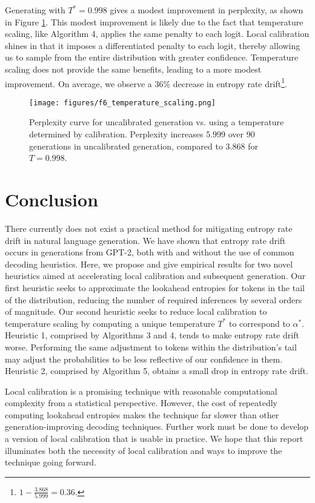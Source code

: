 \documentclass[pageno]{jpaper}
\begin{document}
Generating with $T^*=0.998$ gives a modest improvement in perplexity, as shown in Figure \ref{temp-scaling}. This modest improvement is likely due to the fact that temperature scaling, like Algorithm 4, applies the same penalty to each logit. Local calibration shines in that it imposes a differentiated penalty to each logit, thereby allowing us to sample from the entire distribution with greater confidence. Temperature scaling does not provide the same benefits, leading to a more modest improvement. On average, we observe a 36\% decrease in entropy rate drift\footnote{$1 - \frac{3.868}{5.999} = 0.36$.}.

\begin{figure}
    \centering
    \texttt{[image: figures/f6\_temperature\_scaling.png]}
    \caption{Perplexity curve for uncalibrated generation vs. using a temperature determined by calibration. Perplexity increases 5.999 over 90 generations in uncalibrated generation, compared to 3.868 for $T=0.998$.}
    \label{temp-scaling}
\end{figure}

\section{Conclusion}

There currently does not exist a practical method for mitigating entropy rate drift in natural language generation. We have shown that entropy rate drift occurs in generations from GPT-2, both with and without the use of common decoding heuristics. Here, we propose and give empirical results for two novel heuristics aimed at accelerating local calibration and subsequent generation. Our first heuristic seeks to approximate the lookahead entropies for tokens in the tail of the distribution, reducing the number of required inferences by several orders of magnitude. Our second heuristic seeks to reduce local calibration to temperature scaling by computing a unique temperature $T^*$ to correspond to $\alpha^*$. Heuristic 1, comprised by Algorithms 3 and 4, tends to make entropy rate drift worse. Performing the same adjustment to tokens within the distribution's tail may adjust the probabilities to be less reflective of our confidence in them. Heuristic 2, comprised by Algorithm 5, obtains a small drop in entropy rate drift.

Local calibration is a promising technique with reasonable computational complexity from a statistical perspective. However, the cost of repeatedly computing lookahead entropies makes the technique far slower than other generation-improving decoding techniques. Further work must be done to develop a version of local calibration that is usable in practice. We hope that this report illuminates both the necessity of local calibration and ways to improve the technique going forward.
\end{document}
